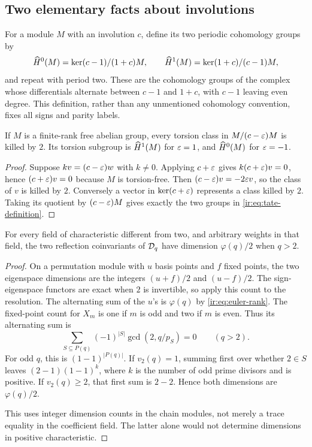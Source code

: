 \subsection{Two elementary facts about involutions}
For a module $M$ with an involution $c$, define its two periodic
cohomology groups by
\begin{equation}\label{ir:eq:tate-definition}
 \widehat H^0(M)=\ker(c-1)/(1+c)M,\qquad
 \widehat H^1(M)=\ker(1+c)/(c-1)M,
\end{equation}
and repeat with period two. These are the cohomology groups of the
complex whose differentials alternate between $c-1$ and $1+c$,
with $c-1$ leaving even degree. This definition, rather than any
unmentioned cohomology convention, fixes all signs and parity labels.

\begin{lemma}\label{ir:lem:torsion-tate}
If $M$ is a finite-rank free abelian group, every torsion class in
$M/(c-\varepsilon)M$ is killed by $2$. Its torsion subgroup is
$\widehat H^1(M)$ for $\varepsilon=1$, and $\widehat H^0(M)$ for $\varepsilon=-1$.
\end{lemma}
\begin{proof}
Suppose $k v=(c-\varepsilon)w$ with $k\ne0$. Applying $c+\varepsilon$ gives
$k(c+\varepsilon)v=0$, hence $(c+\varepsilon)v=0$ because $M$ is torsion-free.
Then $(c-\varepsilon)v=-2\varepsilon v$, so the class of $v$ is killed by $2$.
Conversely a vector in $\ker(c+\varepsilon)$ represents a class killed by
$2$. Taking its quotient by $(c-\varepsilon)M$ gives exactly the two groups
in \eqref{ir:eq:tate-definition}.
\end{proof}

\begin{lemma}\label{ir:lem:balanced}
For every field of characteristic different from two, and arbitrary
weights in that field, the two reflection coinvariants of $\mathcal D_q$
have dimension $\varphi(q)/2$ when $q>2$.
\end{lemma}
\begin{proof}
On a permutation module with $u$ basis points and $f$ fixed points,
the two eigenspace dimensions are the integers $(u+f)/2$ and
$(u-f)/2$. The sign-eigenspace functors are exact when $2$ is
invertible, so apply this count to the resolution. The alternating
sum of the $u$'s is $\varphi(q)$ by \eqref{ir:eq:euler-rank}.
The fixed-point count for $X_m$ is one if $m$ is odd and two if
$m$ is even. Thus its alternating sum is
\[
 \sum_{S\subseteq P(q)}(-1)^{|S|}\gcd(2,q/p_S)=0
 \qquad(q>2).
\]
For odd $q$, this is $(1-1)^{|P(q)|}$. If $v_2(q)=1$, summing
first over whether $2\in S$ leaves $(2-1)(1-1)^k$, where
$k$ is the number of odd prime divisors and is positive. If
$v_2(q)\ge2$, that first sum is $2-2$. Hence both dimensions
are $\varphi(q)/2$.

This uses integer dimension counts in the chain modules, not merely
a trace equality in the coefficient field. The latter alone would
not determine dimensions in positive characteristic.
\end{proof}

